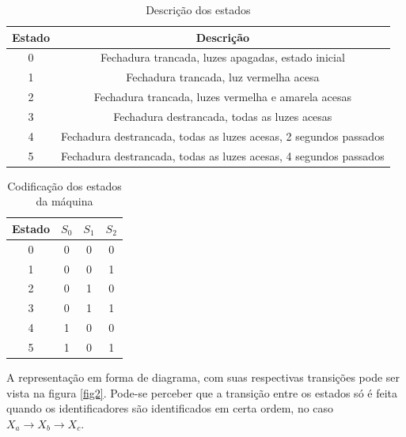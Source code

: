 \documentclass[12pt,a4paper]{article}
\begin{document}
\begin{table}[hb]
\begin{center}
\begin{tabular}{ c | c }
\textbf{Estado} & \textbf{Descrição}\\ 
\hline
0 & Fechadura trancada, luzes apagadas, estado inicial \\
1 & Fechadura trancada, luz vermelha acesa \\
2 & Fechadura trancada, luzes vermelha e amarela acesas \\
3 & Fechadura destrancada, todas as luzes acesas \\
4 & Fechadura destrancada, todas as luzes acesas, 2 segundos passados \\
5 & Fechadura destrancada, todas as luzes acesas, 4 segundos passados \\ 
\end{tabular}
\end{center}
\caption{Descrição dos estados}
\label{tab2}
\end{table}


\begin{table}[!hb]
\begin{center}
\begin{tabular}{c|ccc}
Estado & $S_0$ & $S_1$ & $S_2$ \\ \hline
0 & 0 & 0 & 0 \\
1 & 0 & 0 & 1 \\
2 & 0 & 1 & 0 \\
3 & 0 & 1 & 1 \\
4 & 1 & 0 & 0 \\
5 & 1 & 0 & 1 \\
\end{tabular}
\end{center}
\caption{Codificação dos estados da máquina}
\label{tab3}
\end{table}

A representação em forma de diagrama, com suas respectivas transições pode ser vista na figura \ref{fig2}. Pode-se perceber que a transição entre os estados só é feita quando os identificadores são identificados em certa ordem, no caso $X_a \rightarrow X_b \rightarrow X_c$.
\end{document}
